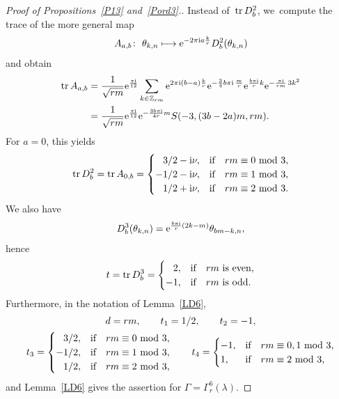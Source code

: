 \documentclass[pdftex]{sigma}
\newcommand\Z{{\mathbb Z}}
\newcommand{\tr}{\mathop{{\rm tr}}}
\numberwithin{equation}{section}
\begin{document}
\begin{proof}[Proof of Propositions~\ref{P13} and~\ref{Pord3}.]
Instead of~$\tr D_b^2$, we~compute the trace of the more general map
\begin{gather*}
A_{a,b}\colon\ \theta_{k,n}\longmapsto {\rm e}^{-2\pi {\rm i} a\frac kr} D_b^2(\theta_{k,n})
\end{gather*}
and obtain
\begin{align}
\tr A_{a,b}&=\frac1{\sqrt{rm}} {\rm e}^{\frac {\pi {\rm i}}{12}}\sum_{k\in\Z_{rm}} {\rm e}^{2\pi {\rm i}(b-a)\frac{k}r} {\rm e}^{-\frac {3}4b\pi {\rm i}\,\frac mr} {\rm e}^{\frac{b\pi {\rm i}}rk} {\rm e}^{-\frac{\pi {\rm i}}{rm}\, 3k^2}\nonumber
\\
&=\frac1{\sqrt{rm}} {\rm e}^{\frac {\pi {\rm i}}{12}} {\rm e}^{-\frac{3b\pi {\rm i}}{4r}m}S(-3,(3b-2a)m,rm).
\label{trA}
\end{align}
For $a=0$, this yields
\begin{gather*}
\tr D_b^2 =\tr A_{0,b}=
\begin{cases}
$\phantom{$-$}$3/2-{\rm i}\nu, &\mbox{if}\quad rm\equiv 0\ {\rm mod}\ 3,
\\
-1/2-{\rm i}\nu, &\mbox{if}\quad rm\equiv 1\ {\rm mod}\ 3,
\\
$\phantom{$-$}$1/2+{\rm i}\nu, &\mbox{if}\quad rm\equiv 2\ {\rm mod}\ 3.
\end{cases}
\end{gather*}
We also have
\begin{gather*}
D_b^3(\theta_{k,n})={\rm e}^{\frac{b\pi {\rm i}}r(2k-m)} \theta_{bm-k,n},
\end{gather*}
hence
\begin{gather*}
t=\tr D_b^3=\begin{cases}
$\phantom{$-$}2$, &\text{if\quad $rm$ is even},
\\
-1,&\text{if\quad $rm$ is odd}.
\end{cases}
\end{gather*}
Furthermore, in the notation of Lemma~\ref{LD6},
\begin{gather*}
d=rm,\qquad t_1=1/2,\qquad t_2=-1,
\\
t_3= \begin{cases}
$\phantom{$-$}$3/2, &\mbox{if}\quad rm\equiv 0\ {\rm mod}\ 3,
\\
-1/2, &\mbox{if}\quad rm\equiv 1\ {\rm mod}\ 3,
\\
$\phantom{$-$}$1/2, &\mbox{if}\quad rm\equiv 2\ {\rm mod}\ 3,
\end{cases}\qquad
t_4=\begin{cases}
-1, &\mbox{if}\quad rm\equiv 0,1\ {\rm mod}\ 3,
\\
1, &\mbox{if}\quad rm\equiv 2\ {\rm mod}\ 3,
\end{cases}
\end{gather*}
and Lemma~\ref{LD6} gives the assertion for $\Gamma=\Gamma^6_r(\lambda)$.


\end{proof}
\end{document}
